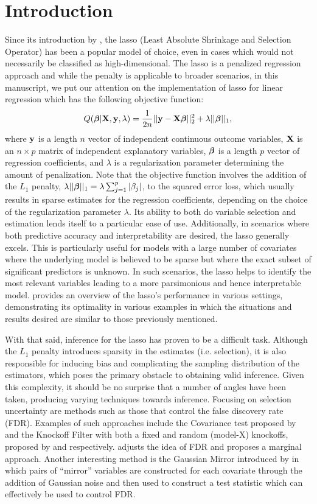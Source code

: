 \section{Introduction}

Since its introduction by \cite{Tibshirani1996}, the lasso (Least Absolute Shrinkage and Selection Operator) has been a popular model of choice, even in cases which would not necessarily be classified as high-dimensional. The lasso is a penalized regression approach and while the penalty is applicable to broader scenarios, in this manuscript, we put our attention on the implementation of lasso for linear regression which has the following objective function: $$Q(\boldsymbol{\beta}|\mathbf{X},\mathbf{y},\lambda) = \frac{1}{2n}||\mathbf{y} - \mathbf{X}\boldsymbol{\beta}||_2^2 + \lambda||\boldsymbol{\beta}||_1,$$ where $\mathbf{y}$ is a length $n$ vector of independent continuous outcome variables, $\mathbf{X}$ is an $n \times p$ matrix of independent explanatory variables, $\boldsymbol{\beta}$ is a length $p$ vector of regression coefficients, and $\lambda$ is a regularization parameter determining the amount of penalization. Note that the objective function involves the addition of the $L_1$ penalty, $\lambda||\boldsymbol{\beta}||_1 = \lambda \sum_{j = 1}^p |\beta_j|$, to the squared error loss, which usually results in sparse estimates for the regression coefficients, depending on the choice of the regularization parameter $\lambda$. Its ability to both do variable selection and estimation lends itself to a particular ease of use. Additionally, in scenarios where both predictive accuracy and interpretability are desired, the lasso generally excels. This is particularly useful for models with a large number of covariates where the underlying model is believed to be sparse but where the exact subset of significant predictors is unknown. In such scenarios, the lasso helps to identify the most relevant variables leading to a more parsimonious and hence interpretable model. \cite{HTF2009} provides an overview of the lasso's performance in various settings, demonstrating its optimality in various examples in which the situations and results desired are similar to those previously mentioned. 

With that said, inference for the lasso has proven to be a difficult task. Although the $L_1$ penalty introduces sparsity in the estimates (i.e. selection), it is also responsible for inducing bias and complicating the sampling distribution of the estimators, which poses the primary obstacle to obtaining valid inference. Given this complexity, it should be no surprise that a number of angles have been taken, producing varying techniques towards inference. Focusing on selection uncertainty are methods such as those that control the false discovery rate (FDR). Examples of such approaches include the Covariance test proposed by \cite{Lockhart2014} and the Knockoff Filter with both a fixed and random (model-X) knockoffs, proposed by \cite{Candes2015} and \cite{Candes2018} respectively. \cite{Breheny2019} adjusts the idea of FDR and proposes a marginal approach. Another interesting method is the Gaussian Mirror introduced by \cite{Xing2023} in which pairs of ``mirror'' variables are constructed for each covariate through the addition of Gaussian noise and then used to construct a test statistic which can effectively be used to control FDR.

